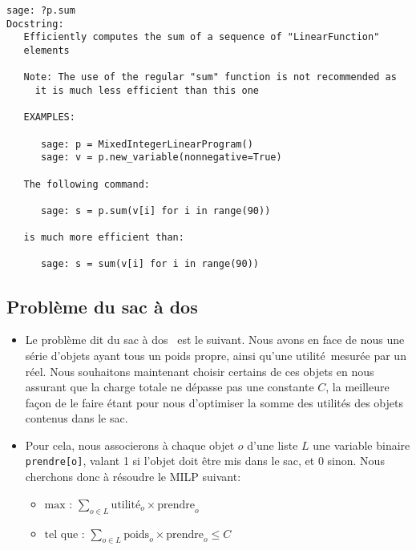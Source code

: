 \documentclass[french]{beamer}
\begin{document}
\begin{frame}[fragile]
\begin{Verbatim}
sage: ?p.sum
Docstring:     
   Efficiently computes the sum of a sequence of "LinearFunction"
   elements

   Note: The use of the regular "sum" function is not recommended as
     it is much less efficient than this one

   EXAMPLES:

      sage: p = MixedIntegerLinearProgram()
      sage: v = p.new_variable(nonnegative=True)

   The following command:

      sage: s = p.sum(v[i] for i in range(90))

   is much more efficient than:

      sage: s = sum(v[i] for i in range(90))
\end{Verbatim}
\end{frame}


\subsection{Problème du sac à dos}


\begin{frame}
  \begin{itemize}
  \item 
  Le problème dit  du \og sac à dos  \fg\ est le suivant. Nous avons  en face de
  nous  une   série  d'objets   ayant  tous  un   poids  propre,   ainsi  qu'une
  \og{}utilité\fg\  mesurée  par un  réel.  Nous  souhaitons maintenant  choisir
  certains de ces  objets en nous assurant  que la charge totale  ne dépasse pas
  une  constante  $C$,  la meilleure  fa\c  con  de  le  faire étant  pour  nous
  d'optimiser la somme des utilités des objets contenus dans le sac.

\item
  
  Pour cela,  nous associerons à chaque  objet $o$ d'une liste  $L$ une variable
  binaire \texttt{prendre[o]}, valant 1 si l'objet doit être mis dans le sac, et
  0 sinon. Nous cherchons donc à résoudre le MILP suivant:

  \begin{itemize}
  \item $\text{max : }\sum_{o\in L}\text{utilité}_o\times \text{prendre}_o$
  \item $ \text{tel que : }\sum_{o\in L} \text{poids}_o\times \text{prendre}_o \leqslant C$
  \end{itemize}

\end{itemize}
\end{frame}
\end{document}
